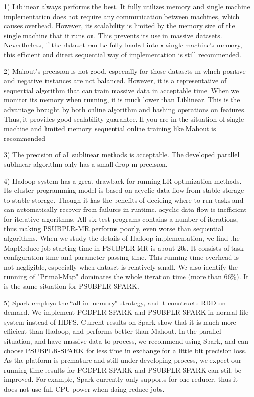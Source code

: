 \documentclass[10pt, conference, compsocconf]{IEEEtran}
\begin{document}
1) Liblinear always performs the best. It fully utilizes memory and single machine implementation does not require any communication between machines, which causes overhead.
          However, its scalability is limited by the memory size of the single machine that it runs on. This prevents its use in massive datasets.
          Nevertheless, if the dataset can be fully loaded into a single machine's memory, this efficient and direct sequential way of implementation is still recommended.

2) Mahout's precision is not good, especially for those datasets in which positive and negative instances are not balanced.
          However, it is a representative of sequential algorithm that can train massive data in acceptable time.
          When we monitor its memory when running, it is much lower than Liblinear. This is the advantage brought by both online algorithm and hashing operations on features.
          Thus, it provides good scalability guarantee. If you are in the situation of single machine and limited memory, sequential online training like Mahout is recommended.

3) The precision of all sublinear methods is acceptable. The developed parallel sublinear algorithm only has a small drop in precision.

4) Hadoop system has a great drawback for running LR optimization methods. Its cluster programming model is based on acyclic data flow from stable storage to stable storage.
          Though it has the benefits of deciding where to run tasks and can automatically recover from failures in runtime, acyclic data flow is inefficient for iterative algorithms.
          All six test programs contains a number of iterations, thus making PSUBPLR-MR performs poorly, even worse than sequential algorithms.
          When we study the details of Hadoop implementation, we find the MapReduce job starting time in PSUBPLR-MR is about 20s. It consists of task configuration time and parameter passing time.
          This running time overhead is not negligible, especially when dataset is relatively small.
          We also identify the running of "Primal-Map" dominates the whole iteration time (more than 66\%). It is the same situation for PSUBPLR-SPARK.

5) Spark employs the ``all-in-memory" strategy, and it constructs RDD on demand. We implement PGDPLR-SPARK and PSUBPLR-SPARK in normal file system instead of HDFS.
          Current results on Spark show that it is much more efficient than Hadoop, and performs better than Mahout.
          In the parallel situation, and have massive data to process, we recommend using Spark, and can choose PSUBPLR-SPARK for less time in exchange for a little bit precision loss.
          As the platform is premature and still under developing process, we expect our running time results for PGDPLR-SPARK and PSUBPLR-SPARK can still be improved.
          For example, Spark currently only supports for one reducer, thus it does not use full CPU power when doing reduce jobs.
\end{document}
